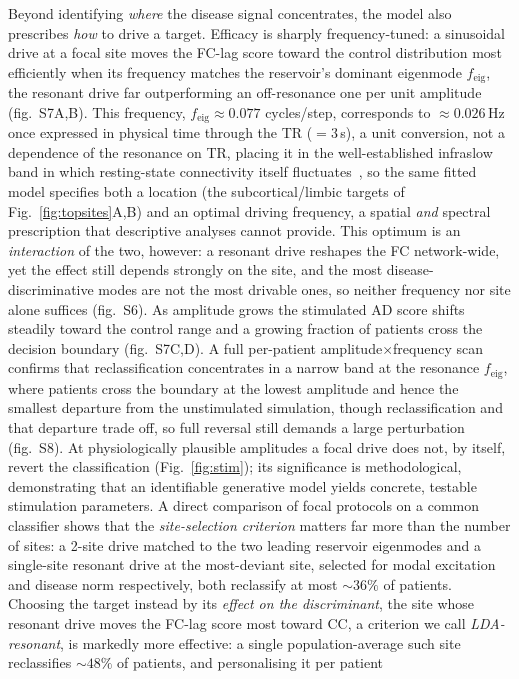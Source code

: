 \documentclass[11pt]{article}
\begin{document}
Beyond identifying \emph{where} the disease signal concentrates, the model also
prescribes \emph{how} to drive a target. Efficacy is sharply frequency-tuned: a
sinusoidal drive at a focal site moves the FC-lag score toward the control
distribution most efficiently when its frequency matches the reservoir's dominant
eigenmode $f_{\mathrm{eig}}$, the resonant drive far outperforming an off-resonance
one per unit amplitude (fig.~S7A,B). This frequency, $f_{\mathrm{eig}}\approx0.077$
cycles/step, corresponds to $\approx0.026$\,Hz once expressed in physical time
through the TR ($=3$\,s), a unit conversion, not a dependence of the resonance on
TR, placing it in the well-established infraslow band in which resting-state
connectivity itself
fluctuates~\cite{fox2007,cordes2001,diantonio2026}, so the same fitted model
specifies both a location
(the subcortical/limbic targets of Fig.~\ref{fig:topsites}A,B) and an optimal driving
frequency, a spatial \emph{and} spectral prescription that descriptive analyses
cannot provide. This optimum is an \emph{interaction} of the two, however: a
resonant drive reshapes the FC network-wide, yet the effect still depends strongly
on the site, and the most disease-discriminative modes are not the most drivable
ones, so neither frequency nor site alone suffices (fig.~S6). As amplitude grows
the stimulated AD score shifts steadily toward the control range and a growing
fraction of patients cross the decision boundary (fig.~S7C,D). A full per-patient
amplitude$\times$frequency scan confirms that reclassification concentrates in a
narrow band at the resonance $f_{\mathrm{eig}}$, where patients cross the boundary
at the lowest amplitude and hence the smallest departure from the unstimulated
simulation, though reclassification and that departure trade off, so full reversal
still demands a large perturbation (fig.~S8). At
physiologically plausible amplitudes a focal drive does not, by itself, revert the
classification (Fig.~\ref{fig:stim}); its significance is methodological, demonstrating that an
identifiable generative model yields concrete, testable stimulation parameters. A
direct comparison of focal protocols on a common classifier shows that the
\emph{site-selection criterion} matters far more than the number of sites: a
2-site drive matched to the two leading reservoir eigenmodes and a single-site
resonant drive at the most-deviant site, selected for modal excitation and
disease norm respectively, both reclassify at most $\sim$$36\%$ of patients.
Choosing the target instead by its \emph{effect on the discriminant}, the site
whose resonant drive moves the FC-lag score most toward CC, a criterion we call
\emph{LDA-resonant}, is markedly more effective: a single population-average such
site reclassifies $\sim$$48\%$ of patients, and personalising it per patient
\end{document}
